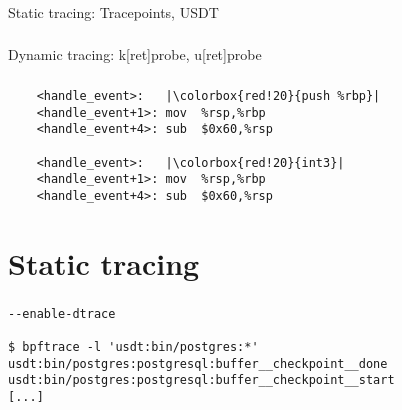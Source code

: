 \documentclass[usenames,dvipsnames, 18pt, compress, aspectratio=169]{beamer}
\begin{document}
\begin{frame}[fragile]{}
    \frametitle{}
    \begin{center}
        Static tracing: Tracepoints, USDT
    \end{center}
\end{frame}

\begin{frame}[fragile]{}
    \frametitle{}
    \begin{center}
        Dynamic tracing: k[ret]probe, u[ret]probe
    \end{center}
\end{frame}

\begin{frame}[fragile]{}
    \frametitle{}
    \begin{center}
        \begin{verbatim}
    <handle_event>:   |\colorbox{red!20}{push %rbp}|
    <handle_event+1>: mov  %rsp,%rbp
    <handle_event+4>: sub  $0x60,%rsp

    <handle_event>:   |\colorbox{red!20}{int3}|
    <handle_event+1>: mov  %rsp,%rbp
    <handle_event+4>: sub  $0x60,%rsp
        \end{verbatim}

    \end{center}
\end{frame}

\section{Static tracing}

\begin{frame}[fragile]{}
    \frametitle{}
    \begin{center}
        \begin{verbatim}
--enable-dtrace

$ bpftrace -l 'usdt:bin/postgres:*'
usdt:bin/postgres:postgresql:buffer__checkpoint__done
usdt:bin/postgres:postgresql:buffer__checkpoint__start
[...]
        \end{verbatim}
    \end{center}
\end{frame}
\end{document}
